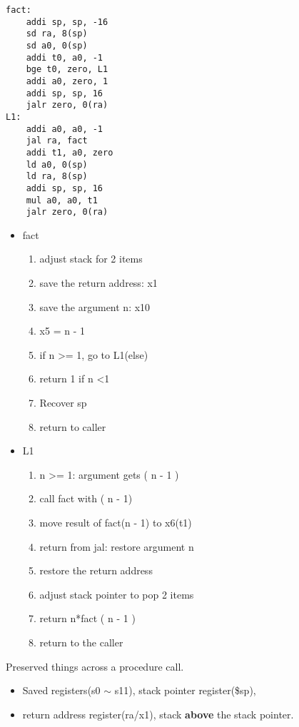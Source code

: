 \begin{lstlisting}[language={[x86masm]Assembler},title={RISC-V assembly code}]
fact:
    addi sp, sp, -16
    sd ra, 8(sp)
    sd a0, 0(sp)
    addi t0, a0, -1
    bge t0, zero, L1
    addi a0, zero, 1
    addi sp, sp, 16
    jalr zero, 0(ra)
L1: 
    addi a0, a0, -1
    jal ra, fact
    addi t1, a0, zero
    ld a0, 0(sp)
    ld ra, 8(sp)
    addi sp, sp, 16
    mul a0, a0, t1
    jalr zero, 0(ra)
\end{lstlisting}
\begin{itemize}
    \item fact
    \begin{enumerate}
        \item adjust stack for 2 items
        \item save the return address: x1
        \item save the argument n: x10
        \item x5 = n - 1
        \item if n >= 1, go to L1(else)
        \item return 1 if n <1
        \item Recover sp
        \item return to caller
    \end{enumerate}
    \item L1
    \begin{enumerate}
        \item  n >= 1: argument gets ( n - 1 )
        \item call fact with ( n - 1)
        \item move result of fact(n - 1) to x6(t1)
        \item return from jal: restore argument n
        \item restore the return address
        \item adjust stack pointer to pop 2 items
        \item return n*fact ( n - 1 )
        \item return to the caller
    \end{enumerate}
\end{itemize}

Preserved things across a procedure call. 
\begin{itemize}
    \item\small Saved registers(s0 $\sim$ s11), stack pointer register(\$sp),
    \item\small return address register(ra/x1), stack \textbf{above} the stack pointer. 
\end{itemize} 

